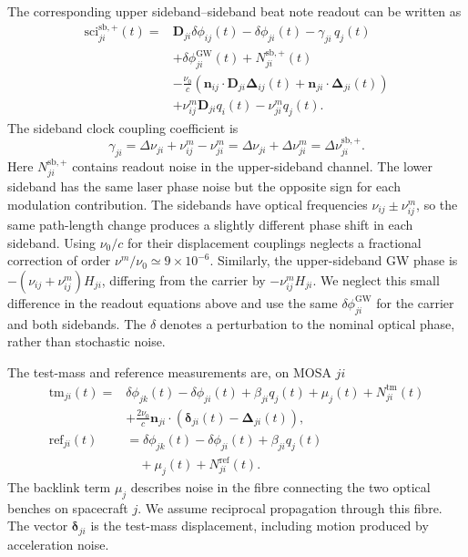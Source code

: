 The corresponding upper sideband–sideband beat note readout can be written as
\begin{align}\label{SB_meas}
    \text{sci}^{\mathrm{sb,+}}_{ji}(t)=&
    \mathbf{D}_{ji}\delta\phi_{ij}(t)- \delta\phi_{ji}(t)- \gamma_{ji}\, q_j(t)\nonumber\\[3pt]
    &+\delta\phi^{\mathrm{GW}}_{ji}(t)+N^{\mathrm{sb,+}}_{ji}(t)\nonumber\\[3pt]
    &-\frac{\nu_0}{c}\left(\mathbf{n}_{ij}\cdot \mathbf{D}_{ji}\bm{\Delta}_{ij}(t)+\mathbf{n}_{ji}\cdot\bm{\Delta}_{ji}(t)\right)
    \nonumber\\[3pt]
    &+\nu^m_{ij} \mathbf{D}_{ji} q_i(t)- \nu^m_{ji} q_j(t).
\end{align}
The sideband clock coupling coefficient is
\begin{equation}
    \gamma_{ji} =\Delta\nu_{ji}+\nu^m_{ij}-\nu^m_{ji}=\Delta\nu_{ji}+\Delta\nu^m_{ji}= \Delta\nu_{ji}^{\mathrm{sb,+}}.
\end{equation}
Here $N^{\mathrm{sb,+}}_{ji}$ contains readout noise in the upper-sideband channel. The lower sideband has the same laser phase noise but the opposite sign for each modulation contribution.
The sidebands have optical frequencies $\nu_{ij}\pm\nu^m_{ij}$, so the same path-length change produces a slightly different phase shift in each sideband. Using $\nu_0/c$ for their displacement couplings neglects a fractional correction of order $\nu^m/\nu_0\simeq9\times10^{-6}$. Similarly, the upper-sideband GW phase is $-(\nu_{ij}+\nu^m_{ij})H_{ji}$, differing from the carrier by $-\nu^m_{ij}H_{ji}$. We neglect this small difference in the readout equations above and use the same $\delta\phi^{\mathrm{GW}}_{ji}$ for the carrier and both sidebands. The $\delta$ denotes a perturbation to the nominal optical phase, rather than stochastic noise.

The test-mass and reference measurements are, on \ac{MOSA} $ji$
\begin{align}
\text{tm}_{ji}(t)= &
\delta\phi_{jk}(t)-\delta\phi_{ji}(t)
+\beta_{ji}q_j(t)+\mu_{j}(t)+N^{\text{tm}}_{ji}(t)\nonumber\\[3pt]
&+\frac{2\nu_0}{c}
\mathbf{n}_{ji}\cdot\left(\bm{\delta}_{ji}(t)-\bm{\Delta}_{ji}(t)\right),\label{eq:testmass_readout}\\[5pt]
\text{ref}_{ji}(t)&=\delta\phi_{jk}(t)-\delta\phi_{ji}(t)+\beta_{ji}q_j(t)\nonumber\\
&\quad+\mu_{j}(t)+N^{\text{ref}}_{ji}(t).\label{eq:reference_readout}
\end{align}
The backlink term $\mu_j$ describes noise in the fibre connecting the two optical benches on spacecraft $j$. We assume reciprocal propagation through this fibre. The vector $\bm\delta_{ji}$ is the test-mass displacement, including motion produced by acceleration noise.

